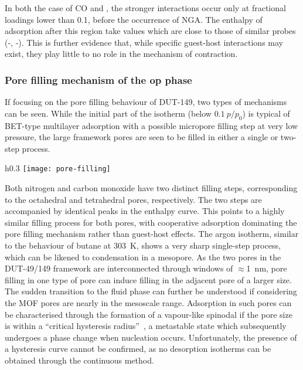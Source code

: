 In both the case of CO and , the 
stronger interactions occur only at fractional loadings lower
than 0.1, before the occurrence of NGA. The enthalpy of 
adsorption after this region take values which are close to
those of similar probes (-, -).
This is further evidence that, while specific guest-host interactions
may exist, they play little to no role in the mechanism of contraction.

\subsubsection{Pore filling mechanism of the \textbf{op} phase}

If focusing on the pore filling behaviour of DUT-149, two types
of mechanisms can be seen. While the initial part of the isotherm 
(below \(0.1~p/p_0\)) is typical of BET-type multilayer adsorption
with a possible micropore filling step at very low pressure,
the large framework pores are seen to be filled in either a single or
two-step process.
\begin{wrapfigure}{h}{0.3\textwidth}
	\centering
	\texttt{[image: pore-filling]}%
    \caption{A dissection of the  isotherm
    at \SI{111}{\kelvin} 
    in components of adsorption in each type of pore.}%
	\label{dut:fgr:pore-filling}
\end{wrapfigure}
Both nitrogen and carbon monoxide have two distinct filling
steps, corresponding to the octahedral and tetrahedral pores,
respectively. The two steps are accompanied by identical 
peaks in the enthalpy curve. This points to a highly similar 
filling process for both pores, with cooperative adsorption
dominating the pore filling mechanism rather than guest-host 
effects. The argon isotherm, similar to the behaviour of 
butane at \SI{303}{\kelvin}, shows a very sharp single-step process,
which can be likened to condensation in a mesopore. As the 
two pores in the DUT-49/149 framework are interconnected through 
windows of \(\approx\)\SI{1}{\nano\metre}, pore filling 
in one type of pore can induce filling in the adjacent pore of 
a larger size. The sudden transition to the fluid phase can further
be understood if considering the MOF pores are nearly in the mesoscale 
range. Adsorption in such pores can be characterised through 
the formation of a vapour-like spinodal if the pore size is within
a ``critical hysteresis radius''~\cite{hiratsukaCriticalEnergyBarrier2016},
a metastable state which subsequently undergoes a phase change when
nucleation occurs. Unfortunately, the presence of a hysteresis curve
cannot be confirmed, as no desorption isotherms can be obtained 
through the continuous method.

